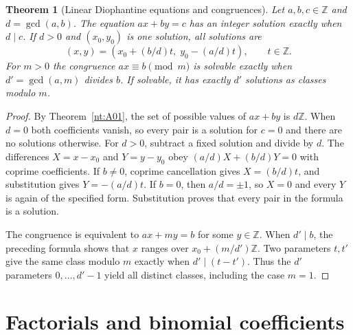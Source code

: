 \documentclass[11pt,oneside,openany]{book}
\theoremstyle{plain}
\newtheorem{theorem}{Theorem}[chapter]
\theoremstyle{definition}
\theoremstyle{remark}
\begin{document}
\begin{theorem}[Linear Diophantine equations and congruences]\label{nt:A03}
Let $a,b,c\in\mathbb Z$ and $d=\gcd(a,b)$. The equation $ax+by=c$
has an integer solution exactly when $d\mid c$. If $d>0$ and
$(x_0,y_0)$ is one solution, all solutions are
\[
 (x,y)=(x_0+(b/d)t,\;y_0-(a/d)t),\qquad t\in\mathbb Z.
\]
For $m>0$ the congruence $ax\equiv b\pmod m$ is solvable exactly
when $d'=\gcd(a,m)$ divides $b$. If solvable, it has exactly $d'$
solutions as classes modulo $m$.
\end{theorem}
\begin{proof}
By Theorem~\ref{nt:A01}, the set of possible values of $ax+by$
is $d\mathbb Z$. When $d=0$ both coefficients vanish, so every
pair is a solution for $c=0$ and there are no solutions otherwise.
For $d>0$, subtract a fixed solution and divide by $d$. The
differences $X=x-x_0$ and $Y=y-y_0$ obey
$(a/d)X+(b/d)Y=0$ with coprime coefficients. If $b\ne0$, coprime
cancellation gives $X=(b/d)t$, and substitution gives $Y=-(a/d)t$.
If $b=0$, then $a/d=\pm1$, so $X=0$ and every $Y$ is again of the
specified form. Substitution proves that every pair in the formula
is a solution.

The congruence is equivalent to $ax+my=b$ for some $y\in\mathbb Z$.
When $d'\mid b$, the preceding formula shows that $x$ ranges over
$x_0+(m/d')\mathbb Z$. Two parameters $t,t'$ give the same class
modulo $m$ exactly when $d'\mid(t-t')$. Thus the $d'$ parameters
$0,\ldots,d'-1$ yield all distinct classes, including the case
$m=1$.
\end{proof}

\section{Factorials and binomial coefficients}
\end{document}
